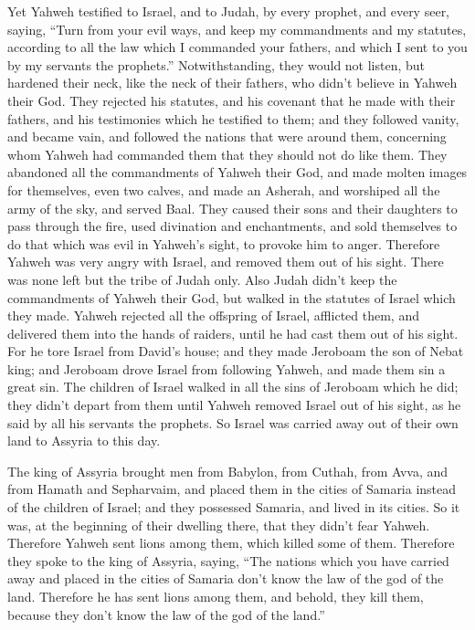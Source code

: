 {Yet Yahweh testified to Israel, and to Judah, by every prophet, and every seer, saying, “Turn from your evil ways, and keep my commandments and my statutes, according to all the law which I commanded your fathers, and which I sent to you by my servants the prophets.”
Notwithstanding, they would not listen, but hardened their neck, like the neck of their fathers, who didn’t believe in Yahweh their God.
They rejected his statutes, and his covenant that he made with their fathers, and his testimonies which he testified to them; and they followed vanity, and became vain, and followed the nations that were around them, concerning whom Yahweh had commanded them that they should not do like them.
They abandoned all the commandments of Yahweh their God, and made molten images for themselves, even two calves, and made an Asherah, and worshiped all the army of the sky, and served Baal.
They caused their sons and their daughters to pass through the fire, used divination and enchantments, and sold themselves to do that which was evil in Yahweh’s sight, to provoke him to anger.
Therefore Yahweh was very angry with Israel, and removed them out of his sight. There was none left but the tribe of Judah only.
Also Judah didn’t keep the commandments of Yahweh their God, but walked in the statutes of Israel which they made.
Yahweh rejected all the offspring of Israel, afflicted them, and delivered them into the hands of raiders, until he had cast them out of his sight.
For he tore Israel from David’s house; and they made Jeroboam the son of Nebat king; and Jeroboam drove Israel from following Yahweh, and made them sin a great sin.
The children of Israel walked in all the sins of Jeroboam which he did; they didn’t depart from them
until Yahweh removed Israel out of his sight, as he said by all his servants the prophets. So Israel was carried away out of their own land to Assyria to this day.
\par }{\PP {}The king of Assyria brought men from Babylon, from Cuthah, from Avva, and from Hamath and Sepharvaim, and placed them in the cities of Samaria instead of the children of Israel; and they possessed Samaria, and lived in its cities.
So it was, at the beginning of their dwelling there, that they didn’t fear Yahweh. Therefore Yahweh sent lions among them, which killed some of them.
Therefore they spoke to the king of Assyria, saying, “The nations which you have carried away and placed in the cities of Samaria don’t know the law of the god of the land. Therefore he has sent lions among them, and behold, they kill them, because they don’t know the law of the god of the land.”
}
